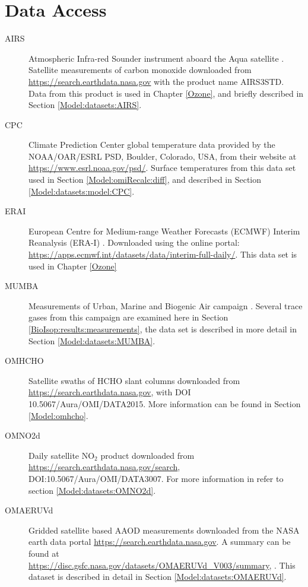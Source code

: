 \section{Data Access}
\label{Model:DataAccess}
\begin{description}
  \item[AIRS] Atmospheric Infra-red Sounder instrument aboard the Aqua satellite \parencite{AIRS3STD}.
  Satellite measurements of carbon monoxide downloaded from \url{https://search.earthdata.nasa.gov} with the product name AIRS3STD.
  Data from this product is used in Chapter \ref{Ozone}, and briefly described in Section \ref{Model:datasets:AIRS}.
  
  \item[CPC] Climate Prediction Center global temperature data provided by the NOAA/OAR/ESRL PSD, Boulder, Colorado, USA, from their website at \url{https://www.esrl.noaa.gov/psd/}.
  Surface temperatures from this data set used in Section \ref{Model:omiRecalc:diff}, and described in Section \ref{Model:datasets:model:CPC}.
  
  \item[ERAI] European Centre for Medium-range Weather Forecasts (ECMWF) Interim Reanalysis (ERA-I) \parencite{Dee2011}. 
  Downloaded using the online portal: \url{https://apps.ecmwf.int/datasets/data/interim-full-daily/}.
  This data set is used in Chapter \ref{Ozone}
  
  \item[MUMBA] Measurements of Urban, Marine and Biogenic Air campaign \parencite{PatonWalsh2017}.
  Several trace gases from this campaign are examined here in Section \ref{BioIsop:results:measurements}, the data set is described in more detail in Section \ref{Model:datasets:MUMBA}.
  
  
  \item[OMHCHO] Satellite swaths of HCHO slant columns downloaded from \url{https://search.earthdata.nasa.gov}, with DOI 10.5067/Aura/OMI/DATA2015.
  More information can be found in Section \ref{Model:omhcho}.
  
  \item[OMNO2d] Daily satellite NO$_2$ product downloaded from \url{https://search.earthdata.nasa.gov/search}, DOI:10.5067/Aura/OMI/DATA3007. 
  For more information in refer to section \ref{Model:datasets:OMNO2d}.
  
  \item[OMAERUVd] Gridded satellite based AAOD measurements downloaded from the NASA earth data portal \url{https://search.earthdata.nasa.gov}.
  A summary can be found at \url{https://disc.gsfc.nasa.gov/datasets/OMAERUVd_V003/summary}, .
  This dataset is described in detail in Section \ref{Model:datasets:OMAERUVd}.
  

\end{description}
